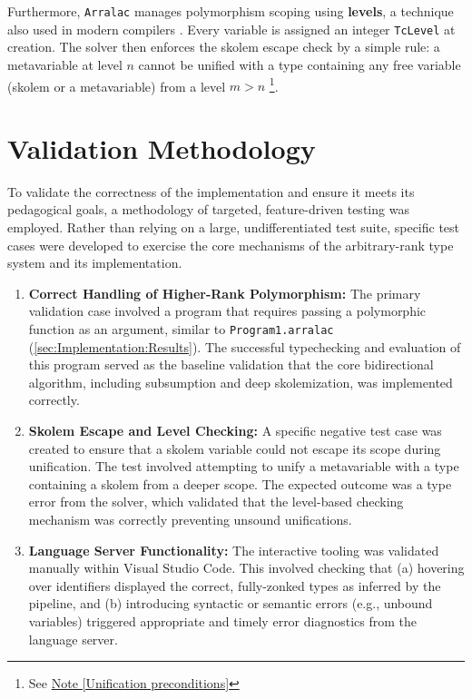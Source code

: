 Furthermore, \texttt{Arralac} manages polymorphism scoping using \textbf{levels}, a technique also used in modern compilers \cite{practical-type-inference-with-levels-2025}. Every variable is assigned an integer \texttt{TcLevel} at creation. The solver then enforces the skolem escape check by a simple rule: a metavariable at level $n$ cannot be unified with a type containing any free variable (skolem or a metavariable) from a level $m > n$ \footnote{See \href{https://github.com/ghc/ghc/blob/ed38c09bd89307a7d3f219e1965a0d9743d0ca73/compiler/GHC/Tc/Utils/Unify.hs\#L2589}{Note [Unification preconditions]}}.

\section{Validation Methodology}
\label{sec:Implementation:Methodology}

To validate the correctness of the implementation and ensure it meets its pedagogical goals, a methodology of targeted, feature-driven testing was employed. Rather than relying on a large, undifferentiated test suite, specific test cases were developed to exercise the core mechanisms of the arbitrary-rank type system and its implementation.

\begin{enumerate}
    \item \textbf{Correct Handling of Higher-Rank Polymorphism:} The primary validation case involved a program that requires passing a polymorphic function as an argument, similar to \texttt{Program1.arralac} (\cref{sec:Implementation:Results}). The successful typechecking and evaluation of this program served as the baseline validation that the core bidirectional algorithm, including subsumption and deep skolemization, was implemented correctly.

    \item \textbf{Skolem Escape and Level Checking:} A specific negative test case was created to ensure that a skolem variable could not escape its scope during unification. The test involved attempting to unify a metavariable with a type containing a skolem from a deeper scope. The expected outcome was a type error from the solver, which validated that the level-based checking mechanism was correctly preventing unsound unifications.

    \item \textbf{Language Server Functionality:} The interactive tooling was validated manually within Visual Studio Code. This involved checking that (a) hovering over identifiers displayed the correct, fully-zonked types as inferred by the pipeline, and (b) introducing syntactic or semantic errors (e.g., unbound variables) triggered appropriate and timely error diagnostics from the language server.
\end{enumerate}

